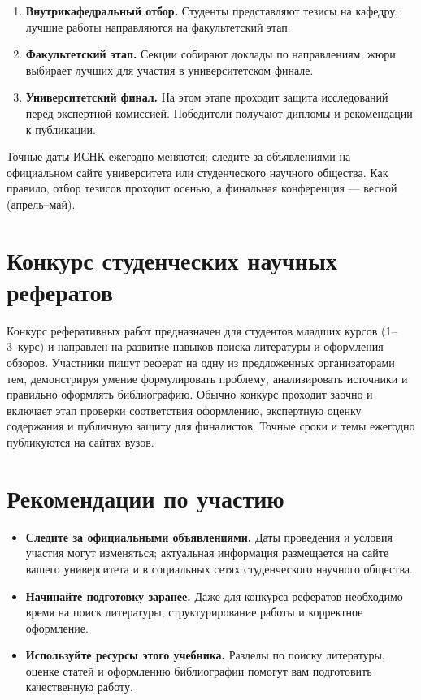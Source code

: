 \documentclass[
  russian,
  12pt,
  a4paper,
]{article}
\providecommand{\tightlist}{%
  \setlength{\itemsep}{0pt}\setlength{\parskip}{0pt}}
\begin{document}
\begin{enumerate}
\def\labelenumi{\arabic{enumi}.}
\tightlist
\item
  \textbf{Внутрикафедральный отбор.} Студенты представляют тезисы на
  кафедру; лучшие работы направляются на факультетский этап.
\item
  \textbf{Факультетский этап.} Секции собирают доклады по направлениям;
  жюри выбирает лучших для участия в университетском финале.
\item
  \textbf{Университетский финал.} На этом этапе проходит защита
  исследований перед экспертной комиссией. Победители получают дипломы и
  рекомендации к публикации.
\end{enumerate}

Точные даты ИСНК ежегодно меняются; следите за объявлениями на
официальном сайте университета или студенческого научного общества. Как
правило, отбор тезисов проходит осенью, а финальная конференция ---
весной (апрель--май).

\section{Конкурс студенческих научных
рефератов}\label{ux43aux43eux43dux43aux443ux440ux441-ux441ux442ux443ux434ux435ux43dux447ux435ux441ux43aux438ux445-ux43dux430ux443ux447ux43dux44bux445-ux440ux435ux444ux435ux440ux430ux442ux43eux432}

Конкурс реферативных работ предназначен для студентов младших курсов
(1--3~курс) и направлен на развитие навыков поиска литературы и
оформления обзоров. Участники пишут реферат на одну из предложенных
организаторами тем, демонстрируя умение формулировать проблему,
анализировать источники и правильно оформлять библиографию. Обычно
конкурс проходит заочно и включает этап проверки соответствия
оформлению, экспертную оценку содержания и публичную защиту для
финалистов. Точные сроки и темы ежегодно публикуются на сайтах вузов.

\section{Рекомендации по
участию}\label{ux440ux435ux43aux43eux43cux435ux43dux434ux430ux446ux438ux438-ux43fux43e-ux443ux447ux430ux441ux442ux438ux44e}

\begin{itemize}
\tightlist
\item
  \textbf{Следите за официальными объявлениями.} Даты проведения и
  условия участия могут изменяться; актуальная информация размещается на
  сайте вашего университета и в социальных сетях студенческого научного
  общества.
\item
  \textbf{Начинайте подготовку заранее.} Даже для конкурса рефератов
  необходимо время на поиск литературы, структурирование работы и
  корректное оформление.
\item
  \textbf{Используйте ресурсы этого учебника.} Разделы по поиску
  литературы, оценке статей и оформлению библиографии помогут вам
  подготовить качественную работу.
\end{itemize}
\end{document}
